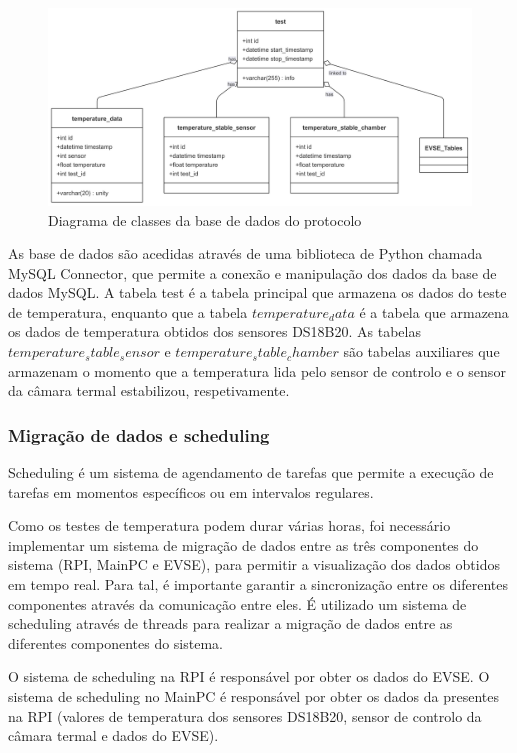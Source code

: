 \begin{figure}[H]
    \centering
    \includegraphics[width=\textwidth]{figures/class_diagram.png}
    \caption{Diagrama de classes da base de dados do protocolo}
    \label{fig:class_diagram}
\end{figure}

As base de dados são acedidas através de uma biblioteca de Python chamada MySQL Connector, que permite a conexão e manipulação dos 
dados da base de dados MySQL. A tabela test é a tabela principal que armazena os dados do teste de temperatura,
enquanto que a tabela $temperature_data$ é a tabela que armazena os dados de temperatura obtidos dos sensores DS18B20.
As tabelas $temperature_stable_sensor$ e $temperature_stable_chamber$ são tabelas auxiliares que armazenam o momento que a temperatura
lida pelo sensor de controlo e o sensor da câmara termal estabilizou, respetivamente.

\subsubsection{Migração de dados e scheduling}

Scheduling é um sistema de agendamento de tarefas que permite a execução de tarefas em momentos específicos ou em intervalos regulares.

Como os testes de temperatura podem durar várias horas, foi necessário implementar um sistema de migração de dados entre as três 
componentes do sistema (RPI, MainPC e EVSE), para permitir a visualização dos dados obtidos em tempo real. Para tal, é importante
garantir a sincronização entre os diferentes componentes através da comunicação entre eles. É utilizado um sistema de scheduling
através de threads para realizar a migração de dados entre as diferentes componentes do sistema.

O sistema de scheduling na RPI é responsável por obter os dados do EVSE. O sistema de scheduling no MainPC é responsável por
obter os dados da presentes na RPI (valores de temperatura dos sensores DS18B20, sensor de controlo da câmara termal e dados do EVSE).

